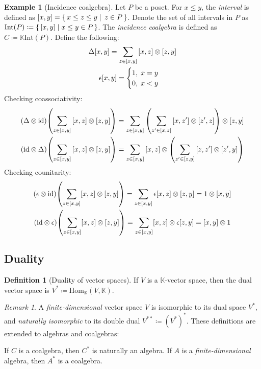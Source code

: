 \documentclass{article}
\theoremstyle{definition}
\newtheorem{Definition}{Definition}
\newtheorem{Example}{Example}
\theoremstyle{remark}
\newtheorem*{Remark*}{Remark}
\theoremstyle{underline}
\theoremstyle{underline}
\newcommand{\id}{\mathrm{id}}
\newcommand{\Hom}{\mathrm{Hom}}
\begin{document}
	\begin{Example}[Incidence coalgebra]
		Let $P$ be a poset. For $x \leq y$, the \emph{interval} is defined as $\bqty{x,y} = \qty{\, x \leq z \leq y \mid \, z \in P \,}$. Denote the set of all intervals in $P$ as $\mathrm{Int}(P) \coloneqq \qty{\, \bqty{x,y} \mid x \leq y \in P \,}$. The \emph{incidence coalgebra} is defined as $C \coloneqq \mathbb K \mathrm{Int}(P)$. Define the following:
		\begin{gather*}
			\Delta\bqty{x,y} = \sum_{z \in [x, y]} \bqty{x,z} \otimes \bqty{z,y} \\
			\epsilon{\bqty{x,y}} =
			\begin{cases}
				1, \; x = y \\
				0, \; x < y
			\end{cases}
		\end{gather*}
		Checking coassociativity:
		\begin{gather*}
			\pqty{\Delta \otimes \id}\pqty{\sum_{z \in [x, y]} \bqty{x,z} \otimes \bqty{z,y}} = \sum_{z \in [x, y]}\pqty{\sum_{z' \in [x, z]} \bqty{x,z'} \otimes \bqty{z',z}} \otimes \bqty{z,y} \\
			\pqty{\id \otimes \Delta}\pqty{\sum_{z \in [x, y]} \bqty{x,z} \otimes \bqty{z,y}} = \sum_{z \in [x, y]} \bqty{x,z} \otimes \pqty{\sum_{z' \in [z, y]} \bqty{z,z'} \otimes \bqty{z',y}}
		\end{gather*}
		Checking counitarity:
		\begin{gather*}
		\pqty{\epsilon \otimes \id} \pqty{\sum_{z \in [x, y]} [x, z] \otimes [z, y]} = \sum_{z \in [x, y]} \epsilon [x, z] \otimes [z, y] = 1 \otimes [x, y]\\
		\pqty{\id \otimes \epsilon} \pqty{\sum_{z \in [x, y]} [x, z] \otimes [z, y]} = \sum_{z \in [x, y]} [x, z] \otimes \epsilon [z, y] = [x, y] \otimes 1
		\end{gather*}
	\end{Example}

	\subsection{Duality}

	\begin{Definition}[Duality of vector spaces]
		If $V$ is a $\mathbb K$-vector space, then the dual vector space is $V^* \coloneqq \Hom_{\mathbb K}(V, \mathbb K)$.
	\end{Definition}

	\begin{Remark*}
		A \emph{finite-dimensional} vector space $V$ is isomorphic to its dual space $V^*$, and \emph{naturally isomorphic} to its double dual $V^{**} \coloneqq (V^*)^*$. These definitions are extended to algebras and coalgebras:
		
		If $C$ is a coalgebra, then $C^*$ is naturally an algebra. If $A$ is a \emph{finite-dimensional} algebra, then $A^*$ is a coalgebra.
	\end{Remark*}
\end{document}
